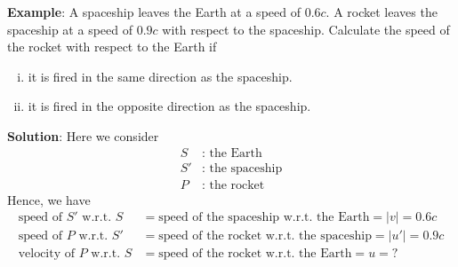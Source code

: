 		\textbf{Example}: A spaceship leaves the Earth at a speed of $0.6c$. A rocket leaves the spaceship at a speed of $0.9c$ with respect to the spaceship. Calculate the speed of the rocket with respect to the Earth if
		\begin{enumerate}[i)]
			\item it is fired in the same direction as the spaceship.
			\item it is fired in the opposite direction as the spaceship.
		\end{enumerate}
		\textbf{Solution}: Here we consider
		\begin{align*}
			S&\text{: the Earth} \\
			S'&\text{: the spaceship} \\
			P&\text{: the rocket}
		\end{align*}
		Hence, we have
		\begin{align*}
			\text{speed of }S'\text{ w.r.t. }S&=\text{speed of the spaceship w.r.t. the Earth}=|v|=0.6c \\
			\text{speed of }P\text{ w.r.t. }S'&=\text{speed of the rocket w.r.t. the spaceship}=|u'|=0.9c \\
			\text{velocity of }P\text{ w.r.t. }S&=\text{speed of the rocket w.r.t. the Earth}=u=?
		\end{align*}
